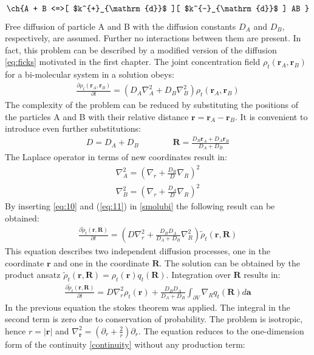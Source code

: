 \documentclass[
  a4paper,BCOR10mm,twoside,
  headsepline,footsepline,%
  fleqn,openbib
]{scrbook}
\begin{document}
\begin{align}\label{reactionscemebi}
\text{\ch{A + B <=>[ $k^{+}_{\mathrm{d}}$ ][ $k^{-}_{\mathrm{d}}$ ] AB }}
\end{align}
Free diffusion of particle A and B with the diffusion constants $D_A$ and $D_B$, respectively, are assumed. Further no interactions between them are present. In fact, this problem can be described by a modified version of the diffusion \cref{eq:ficks} motivated in the first chapter.
The joint concentration field $\rho_t(\bm{r}_A,\bm{r}_B)$ for a bi-molecular system in a solution obeys:
\begin{align}
 \frac{\partial \rho_t(\bm{r}_A,\bm{r}_B)}{\partial t}=(D_A \nabla^{2}_{A}+D_B \nabla^{2}_{B}) \rho_t(\bm{r}_A,\bm{r}_B) \label{smolubi}
\end{align}
The complexity of the problem can be reduced by substituting the positions of the particles A and B with their relative distance $\bm{r}=\bm{r}_A-\bm{r}_B$. It is convenient to introduce even further substitutions:
\begin{align}
 D= D_A+D_B \qquad \qquad \bm{R}=\frac{D_B \bm{r}_A+ D_A \bm{r}_B}{D_A+D_B}
\end{align}
The Laplace operator in terms of new coordinates result in:
\begin{align}
\nabla^{2}_{A} = \left( \nabla_r+\frac{D_B}{D} \nabla_R \right)^2 \label{eq:10}\\
\nabla^{2}_{B} = \left( \nabla_r+\frac{D_A}{D} \nabla_R \right)^2 \label{eq:11}
\end{align}
By inserting \cref{eq:10}  and (\ref{eq:11}) in \cref{smolubi} the following result can be obtained:
\begin{align}
 \frac{\partial \tilde{\rho}_t(\bm{r},\bm{R})}{\partial t}=\left(D \nabla^{2}_{r}+\frac{D_B D_A}{D_A+D_B}\nabla^{2}_{R}\right) \tilde{\rho}_t(\bm{r},\bm{R})
\end{align}
This equation describes two independent diffusion processes, one in the coordinate $\bm{r}$ and one in the coordinate $\bm{R}$. The solution can be obtained by the product ansatz $\tilde{\rho}_t(\bm{r},\bm{R})=\rho_t(\bm{r})q_t(\bm{R})$. Integration over $\bm{R}$ results in:
\begin{align}
\frac{\partial \tilde{\rho}_t(\bm{r},\bm{R})}{\partial t}=D \nabla^{2}_{r} \rho_t(\bm{r}) +\frac{D_B D_A}{D_A+D_B}   \int_{\partial V} \nabla_{R} q_t(\bm{R}) d \bm{a}
\end{align}
In the previous equation the stokes theorem was applied. The integral in the second term is zero due to conservation of probability. The problem is isotropic, hence $r=|\bm{r}|$ and $\nabla^{2}_{\bm{r}}=\left(\partial_r+\frac{2}{r}\right)\partial_r$. The equation reduces to the one-dimension form of the continuity \cref{continuity} without any production term:
\end{document}
